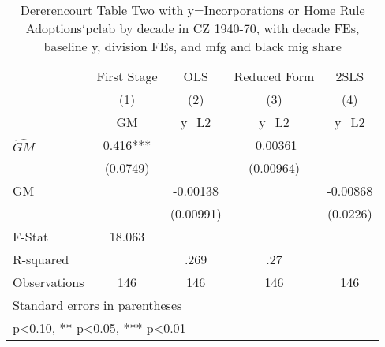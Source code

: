 \begin{table}[htbp]\centering
\def\sym#1{\ifmmode^{#1}\else\(^{#1}\)\fi}
\caption{Dererencourt Table Two with y=Incorporations or Home Rule Adoptions`pclab by decade in CZ 1940-70, with decade FEs, baseline y, division FEs, and mfg and black mig share}
\begin{tabular}{l*{4}{c}}
\toprule
                    & First Stage   &         OLS   &Reduced Form   &        2SLS   \\
                    &\multicolumn{1}{c}{(1)}&\multicolumn{1}{c}{(2)}&\multicolumn{1}{c}{(3)}&\multicolumn{1}{c}{(4)}\\
                    &\multicolumn{1}{c}{GM}&\multicolumn{1}{c}{y\_L2}&\multicolumn{1}{c}{y\_L2}&\multicolumn{1}{c}{y\_L2}\\
\midrule
$\hat{GM}$          &       0.416***&               &    -0.00361   &               \\
                    &    (0.0749)   &               &   (0.00964)   &               \\
\addlinespace
GM                  &               &    -0.00138   &               &    -0.00868   \\
                    &               &   (0.00991)   &               &    (0.0226)   \\
\midrule
F-Stat              &      18.063   &               &               &               \\
R-squared           &               &        .269   &         .27   &               \\
Observations        &         146   &         146   &         146   &         146   \\
\bottomrule
\multicolumn{5}{l}{\footnotesize Standard errors in parentheses}\\
\multicolumn{5}{l}{\footnotesize * p<0.10, ** p<0.05, *** p<0.01}\\
\end{tabular}
\end{table}

